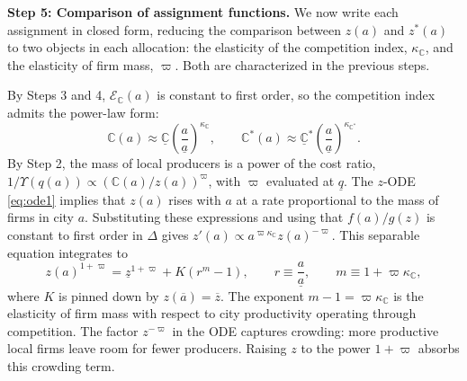 \noindent \textbf{Step 5: Comparison of assignment functions.} We now write each assignment in closed form, reducing the comparison between $z(a)$ and $z^*(a)$ to two objects in each allocation: the elasticity of the competition index, $\kappa_{\mathbb{C}}$, and the elasticity of firm mass, $\varpi$. Both are characterized in the previous steps.

By Steps 3 and 4, $\mathcal{E}_\mathbb{C}(a)$ is constant to first order, so the competition index admits the power-law form:
%
\begin{equation*}
    \mathbb{C}(a) \approx \underline{\mathbb{C}} \left(\frac{a}{\underline{a}}\right)^{\kappa_{\mathbb{C}}}, \qquad \mathbb{C}^*(a) \approx \underline{\mathbb{C}}^* \left(\frac{a}{\underline{a}}\right)^{\kappa_{\mathbb{C}^*}}.
\end{equation*}
%
By Step 2, the mass of local producers is a power of the cost ratio, $1/\Upsilon(q(a)) \propto \left(\mathbb{C}(a)/z(a)\right)^{\varpi}$, with $\varpi$ evaluated at $\underline{q}$. The $z$-ODE \eqref{eq:ode1} implies that $z(a)$ rises with $a$ at a rate proportional to the mass of firms in city $a$. Substituting these expressions and using that $f(a)/g(z)$ is constant to first order in $\Delta$ gives $z'(a) \propto a^{\varpi \kappa_{\mathbb{C}}} z(a)^{-\varpi}$. This separable equation integrates to
%
\begin{equation*}
z(a)^{1 + \varpi} = \underline{z}^{1+\varpi} + K \left(r^{m} - 1\right), \qquad r \equiv \frac{a}{\underline{a}}, \qquad m \equiv 1 + \varpi \kappa_{\mathbb{C}},
\end{equation*}
%
where $K$ is pinned down by $z(\overline{a}) = \overline{z}$. The exponent $m-1=\varpi\kappa_{\mathbb C}$ is the elasticity of firm mass with respect to city productivity operating through competition. The factor $z^{-\varpi}$ in the ODE captures crowding: more productive local firms leave room for fewer producers. Raising $z$ to the power $1+\varpi$ absorbs this crowding term.

